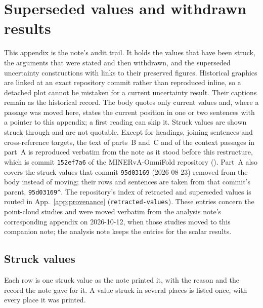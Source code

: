 \section{Superseded values and withdrawn results}
\label{app:history}

This appendix is the note's audit trail. It holds the values that have been struck, the arguments that were stated and then withdrawn, and the superseded uncertainty constructions with links to their preserved figures. Historical graphics are linked at an exact repository commit rather than reproduced inline, so a detached plot cannot be mistaken for a current uncertainty result. Their captions remain as the historical record. The body quotes only current values and, where a passage was moved here, states the current position in one or two sentences with a pointer to this appendix; a first reading can skip it. Struck values are shown struck through and are not quotable. Except for headings, joining sentences and cross-reference targets, the text of parts~B and~C and of the context passages in part~A is reproduced verbatim from the note as it stood before this restructure, which is commit \texttt{152ef7a6} of the MINERvA-OmniFold repository (\repolink). Part~A also covers the struck values that commit \texttt{95d03169} (2026-08-23) removed from the body instead of moving; their rows and sentences are taken from that commit's parent, \texttt{95d03169\^{}}. The repository's index of retracted and superseded values is routed in App.~\ref{app:provenance} (\texttt{retracted-values}). These entries concern the point-cloud studies and were moved verbatim from the analysis note's corresponding appendix on 2026-10-12, when those studies moved to this companion note; the analysis note keeps the entries for the scalar results.

\subsection{Struck values}
\label{app:history-pet-errata}

Each row is one struck value as the note printed it, with the reason and the record the note gave for it. A value struck in several places is listed once, with every place it was printed.

